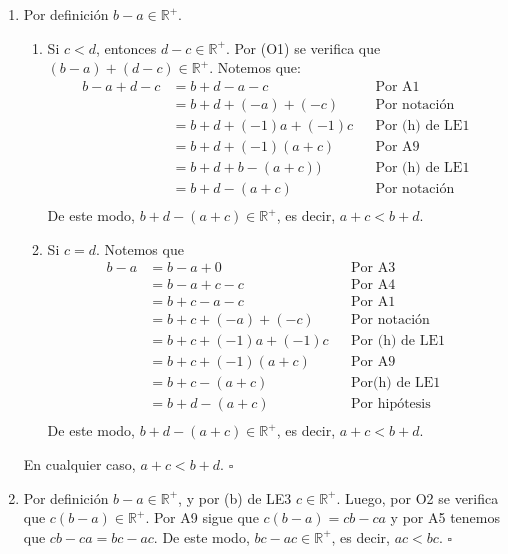 \documentclass[11pt]{article}
\begin{document}
\begin{enumerate}[label=\alph*),font=\bfseries]
    \item Por definición $b-a \in \mathbb{R}^+$.
        \begin{enumerate}[label=\roman*), font=\bfseries]
        \item Si $c<d$, entonces $d-c \in \mathbb{R}^+$. Por (O1) se verifica que $(b-a)+(d-c) \in \mathbb{R}^+$. Notemos que:
        \begin{align*}
        b-a+d-c &= b+d-a-c && \text{Por A1}\\
        &= b+d+(-a)+(-c) && \text{Por notación}\\
        &= b+d+(-1)a+(-1)c && \text{Por (h) de LE1}\\
        &= b+d+ (-1) (a + c) && \text{Por A9}\\
        &= b+d + b-(a+c) \big) && \text{Por (h) de LE1}\\
        &= b+d - (a+c) && \text{Por notación}\\
        \end{align*}
        De este modo, $b+d-(a+c)\in \mathbb{R}^+$, es decir, $a+c<b+d$.
        \item Si $c=d$. Notemos que
        \begin{align*}
        b - a &= b -a + 0 && \text{Por A3}\\
        &= b-a+c-c && \text{Por A4}\\
        &= b+c-a-c && \text{Por A1}\\
        &= b+c+(-a)+(-c) && \text{Por notación}\\
        &= b+c+(-1)a+(-1)c && \text{Por (h) de LE1}\\
        &= b+c+(-1)(a+c) && \text{Por A9}\\
        &= b+c-(a+c) && \text{Por(h) de LE1}\\
        &= b+d-(a+c) && \text{Por hipótesis}\\
        \end{align*}
        De este modo, $b+d-(a+c)\in \mathbb{R}^+$, es decir, $a+c<b+d$.
        \end{enumerate}
        En cualquier caso, $a+c<b+d$. \mbox{}\hfill $\square$


    \item Por definición $b-a \in \mathbb{R}^+$, y por (b) de LE3 $c \in \mathbb{R}^+$. Luego, por O2 se verifica que $c(b-a) \in \mathbb{R}^+$. Por A9 sigue que $c(b-a)=cb-ca$ y por A5 tenemos que $cb-ca=bc-ac$. De este modo, $bc-ac \in \mathbb{R}^+$, es decir, $ac<bc$.
    \mbox{}\hfill $\square$


\end{enumerate}
\end{document}
